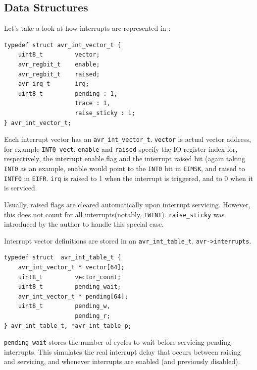 \subsection{Data Structures}

Let's take a look at how interrupts are represented in \simavr:

\begin{lstlisting}
typedef struct avr_int_vector_t {
    uint8_t         vector;
    avr_regbit_t    enable;
    avr_regbit_t    raised;
    avr_irq_t       irq;
    uint8_t         pending : 1,
                    trace : 1,
                    raise_sticky : 1;
} avr_int_vector_t;
\end{lstlisting}

Each interrupt vector has an \lstinline|avr_int_vector_t|. \lstinline|vector| is
actual vector address, for example \lstinline|INT0_vect|. \lstinline|enable|
and \lstinline|raised| specify the \ac{IO} register index for, respectively, the
interrupt enable flag and the interrupt raised bit (again taking \lstinline|INT0|
as an example, enable would point to the \lstinline|INT0| bit in \lstinline|EIMSK|,
and raised to \lstinline|INTF0| in \lstinline|EIFR|. \lstinline|irq| is raised to
1 when the interrupt is triggered, and to 0 when it is serviced.

Usually, raised flags are cleared automatically upon interrupt servicing. However,
this does not count for all interrupts(notably, \lstinline|TWINT|).
\lstinline|raise_sticky| was introduced by the author to handle this special case.

Interrupt vector definitions are stored in an \lstinline|avr_int_table_t|,
\lstinline|avr->interrupts|.

\begin{lstlisting}
typedef struct  avr_int_table_t {
    avr_int_vector_t * vector[64];
    uint8_t         vector_count;
    uint8_t         pending_wait;
    avr_int_vector_t * pending[64];
    uint8_t         pending_w,
                    pending_r;
} avr_int_table_t, *avr_int_table_p;
\end{lstlisting}

\lstinline|pending_wait| stores the number of cycles to wait before servicing
pending interrupts. This simulates the real interrupt delay that occurs between
raising and servicing, and whenever interrupts are enabled
(and previously disabled).

